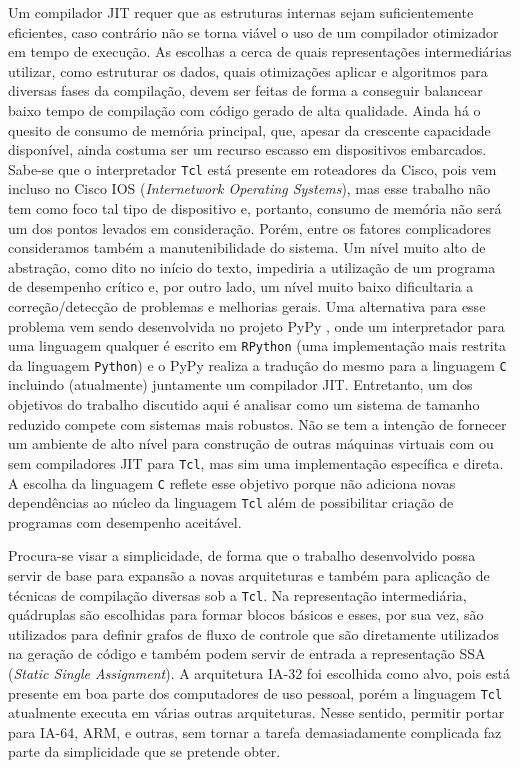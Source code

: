 Um compilador JIT requer que as estruturas internas sejam
suficientemente eficientes, caso contrário não se torna viável o
uso de um compilador otimizador em tempo de execução. As escolhas a
cerca de quais representações intermediárias utilizar, como estruturar
os dados, quais otimizações aplicar e algoritmos para diversas fases da
compilação, devem ser feitas de forma a conseguir balancear baixo
tempo de compilação com código gerado de alta qualidade. Ainda há o
quesito de consumo de memória principal, que, apesar da crescente
capacidade disponível, ainda costuma ser um recurso escasso em
dispositivos embarcados. Sabe-se que o interpretador \texttt{Tcl} está
presente em roteadores da Cisco, pois vem incluso no Cisco IOS
(\textit{Internetwork Operating Systems}), mas esse trabalho
não tem como foco tal tipo de dispositivo e, portanto, consumo de
memória não será um dos pontos levados em consideração. Porém, entre
os fatores complicadores consideramos também a manutenibilidade do
sistema. Um nível muito alto de abstração, como dito no início do
texto, impediria a utilização de um programa de desempenho crítico e,
por outro lado, um nível muito baixo dificultaria a correção/detecção de
problemas e melhorias gerais.
Uma alternativa para esse problema vem sendo desenvolvida no
projeto PyPy \cite{pypy}, onde um interpretador para uma linguagem
qualquer é escrito em \texttt{RPython} (uma implementação mais
restrita da linguagem \texttt{Python}) e o PyPy realiza a tradução do
mesmo para a
linguagem \texttt{C} incluindo (atualmente) juntamente um compilador
JIT. Entretanto, um
dos objetivos do trabalho discutido aqui é analisar como um sistema de
tamanho reduzido compete com sistemas mais robustos. Não se tem a
intenção de fornecer um ambiente de alto nível para construção de
outras máquinas virtuais com ou sem compiladores JIT para
\texttt{Tcl}, mas sim uma implementação específica e direta.
A escolha da
linguagem \texttt{C} reflete esse objetivo porque não adiciona novas
dependências ao núcleo da linguagem \texttt{Tcl} além de possibilitar
criação de programas com desempenho aceitável.

Procura-se visar a simplicidade, de forma que o trabalho desenvolvido
possa servir de base para expansão a novas arquiteturas e também para
aplicação de técnicas de compilação diversas sob a
\texttt{Tcl}. Na representação intermediária, quádruplas são
escolhidas para formar blocos básicos e
esses, por sua vez, são utilizados para definir grafos de fluxo de
controle que são diretamente utilizados na geração de código e também
podem servir de entrada a representação SSA
(\textit{Static Single Assignment}). A arquitetura IA-32 foi escolhida
como alvo, pois está presente em boa parte dos computadores de uso
pessoal, porém a linguagem \texttt{Tcl} atualmente executa em várias
outras arquiteturas. Nesse sentido, permitir portar para IA-64, ARM, e
outras, sem tornar a tarefa demasiadamente complicada faz parte da
simplicidade que se pretende obter.

